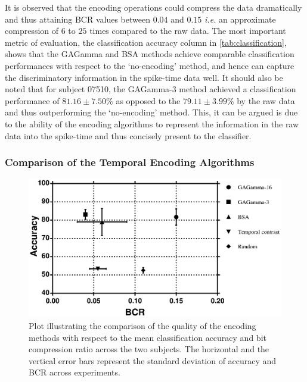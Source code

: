 It is observed that the encoding operations could compress the data dramatically and thus attaining BCR values between $0.04$ and $0.15$ \emph{i.e.} an approximate compression of $6$ to $25$ times compared to the raw data. The most important metric of evaluation, the classification accuracy column in \tablename \ref{tab:classification}, shows that the GAGamma and BSA methods achieve comparable classification performances with respect to the `no-encoding' method, and hence can capture the discriminatory information in the spike-time data well. It should also be noted that for subject 07510, the GAGamma-3 method achieved a classification performance of $81.16\pm 7.50\%$ as opposed to the $79.11\pm 3.99\%$ by the raw data and thus outperforming the `no-encoding' method. This, it can be argued is due to the ability of the encoding algorithms to represent the information in the raw data into the spike-time and thus concisely present to the classifier.
	
\subsubsection{Comparison of the Temporal Encoding Algorithms} 

\begin{figure}
	\centering
	\includegraphics[width=\linewidth]{fig/encoding/encoding_comp_graph.eps}
	\caption{Plot illustrating the comparison of the quality of the encoding methods with respect to the mean classification accuracy and bit compression ratio across the two subjects. The horizontal and the vertical error bars represent the standard deviation of accuracy and BCR across experiments.}
	\label{fig:eval-chart}
\end{figure}


